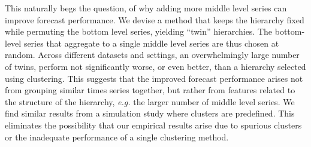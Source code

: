 \documentclass[a4paper,review,12pt,authoryear]{elsarticle}
\begin{document}
This naturally begs the question, of why adding more middle level series can improve forecast performance. We devise a method that keeps the hierarchy fixed while permuting the bottom level series, yielding ``twin'' hierarchies. The bottom-level series that aggregate to a single middle level series are thus chosen at random. Across different datasets and settings, an overwhelmingly large number of twins, perform not significantly worse, or even better, than a hierarchy selected using clustering. This suggests that the improved forecast performance arises not from grouping similar times series together, but rather from features related to the structure of the hierarchy, \textit{e.g.} the larger number of middle level series. We find similar results from a simulation study where clusters are predefined. %
This eliminates the possibility that our empirical results arise due to  spurious clusters or the inadequate performance of a single clustering method.
\end{document}
